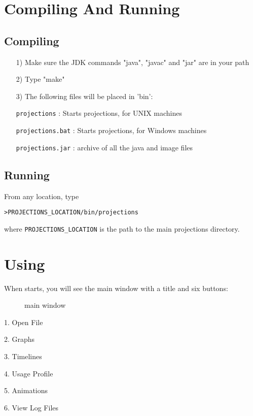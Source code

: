 \documentclass[10pt,dvips]{article}
\begin{document}
\section{Compiling And Running \projections{}}

\subsection{Compiling \projections{}}
\begin{enumerate}
\item[1)]
   Make sure the JDK commands "java", "javac" and "jar"
   are in your path
\item[2)]
   Type "make"
\item[3)]
   The following files will be placed in 'bin':

      {\tt projections}           : Starts projections, for UNIX machines

      {\tt projections.bat}       : Starts projections, for Windows machines

      {\tt projections.jar}       : archive of all the java and image files
\end{enumerate}

\subsection{Running \projections{}}
From any location, type
\begin{alltt}
> PROJECTIONS_LOCATION/bin/projections
\end{alltt}
where {\tt PROJECTIONS\_LOCATION} is the path to the main projections
directory.

\section{Using \projections{}}
When \projections{} starts, you will see the main window with a title and
six buttons:

\begin{figure}[htb]
\center
{}
\caption{\projections{} main window}
\label{mainwindow}
\end{figure}

1. Open File

2. Graphs

3. Timelines

4. Usage Profile

5. Animations

6. View Log Files
\end{document}
